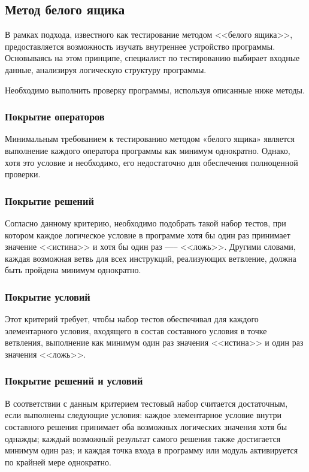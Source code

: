 \documentclass{article}[14pt]
\begin{document}
\subsection{Метод белого ящика}

В рамках подхода, известного как тестирование методом <<белого ящика>>, предоставляется возможность изучать внутреннее 
устройство программы. Основываясь на этом принципе, специалист по тестированию выбирает входные данные, анализируя 
логическую структуру программы.

Необходимо выполнить проверку программы, используя описанные ниже методы.

\subsubsection{Покрытие операторов}

Минимальным требованием к тестированию методом «белого ящика» является выполнение каждого оператора программы как минимум 
однократно. Однако, хотя это условие и необходимо, его недостаточно для обеспечения полноценной проверки.

\subsubsection{Покрытие решений}

Согласно данному критерию, необходимо подобрать такой набор тестов, при котором каждое логическое условие в программе 
хотя бы один раз принимает значение <<истина>> и хотя бы один раз —-- <<ложь>>. Другими словами, каждая возможная ветвь 
для всех инструкций, реализующих ветвление, должна быть пройдена минимум однократно.

\subsubsection{Покрытие условий}

Этот критерий требует, чтобы набор тестов обеспечивал для каждого элементарного условия, входящего в состав составного 
условия в точке ветвления, выполнение как минимум один раз значения <<истина>> и один раз значения <<ложь>>.

\subsubsection{Покрытие решений и условий}

В соответствии с данным критерием тестовый набор считается достаточным, если выполнены следующие условия: каждое 
элементарное условие внутри составного решения принимает оба возможных логических значения хотя бы однажды; каждый 
возможный результат самого решения также достигается минимум один раз; и каждая точка входа в программу или 
модуль активируется по крайней мере однократно.
\end{document}
